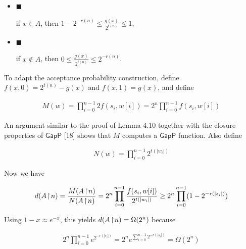 \documentclass[10pt,a4paper]{article}
\begin{document}
\begin{itemize}


\item[] 
$\blacksquare$ 


if $x\in A$, then $1-2^{-r(n)}\leq\frac{g(x)}{2^{t(n)}}\leq 1$,\par





\item[] 
$\blacksquare$ 


if $x\notin A$, then $0\leq\frac{g(x)}{2^{t(n)}}\leq 2^{-r(n)}$.\par





\end{itemize}


To adapt the acceptance probability construction, define $f(x,0)=2^{t(n)}-g(x)$ and $f(x,1)=g(x)$, and define\par


\[\begin{gathered}
M(w)=\prod_{i=0}^{n-1}2f(s_{i},w[i])=2^{n}\prod_{i=0}^{n-1}f(s_{i},w[i])
\end{gathered}\]


An argument similar to the proof of Lemma 4.10 together with the closure properties of $\mathsf{GapP}$ [18] shows that $M$ computes a $\mathsf{GapP}$ function.
Also define\par


\[\begin{gathered}
N(w)=\prod_{i=0}^{n-1}2^{t(|w_{i}|)}
\end{gathered}\]


Now we have\par


\[\begin{gathered}
d(A\negthinspace\upharpoonright\negthinspace n)=\frac{M(A\negthinspace\upharpoonright\negthinspace n)}{N(A\negthinspace\upharpoonright\negthinspace n)}=2^{n}\prod_{i=0}^{n-1}\frac{f(s_{i},w[i])}{2^{t(|w_{i}|)}}\geq 2^{n}\prod_{i=0}^{n-1}(1-2^{-r(|s_{i}|)})
\end{gathered}\]


Using $1-x\approx e^{-x}$, this yields $d(A\negthinspace\upharpoonright\negthinspace n)=\Omega(2^{n})$ because\par


\[\begin{gathered}
2^{n}\prod_{i=0}^{n-1}e^{2^{-r(|s_{i}|)}}=2^{n}e^{\sum\limits_{i=0}^{n-1}2^{-r(|s_{i}|)}}=\Omega(2^{n})
\end{gathered}\]
\end{document}
